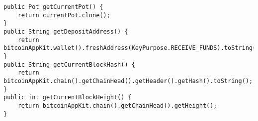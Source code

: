 \begin{lstlisting}
public Pot getCurrentPot() {
    return currentPot.clone();
}
public String getDepositAddress() {
    return bitcoinAppKit.wallet().freshAddress(KeyPurpose.RECEIVE_FUNDS).toString();
}
public String getCurrentBlockHash() {
    return bitcoinAppKit.chain().getChainHead().getHeader().getHash().toString();
}
public int getCurrentBlockHeight() {
    return bitcoinAppKit.chain().getChainHead().getHeight();
}
\end{lstlisting}

